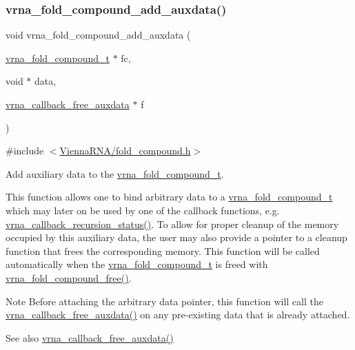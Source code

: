 \subsubsection{\texorpdfstring{vrna\+\_\+fold\+\_\+compound\+\_\+add\+\_\+auxdata()}{vrna\_fold\_compound\_add\_auxdata()}}
{\footnotesize\ttfamily void vrna\+\_\+fold\+\_\+compound\+\_\+add\+\_\+auxdata (\begin{DoxyParamCaption}\item[{\hyperlink{group__fold__compound_ga1b0cef17fd40466cef5968eaeeff6166}{vrna\+\_\+fold\+\_\+compound\+\_\+t} $\ast$}]{fc,  }\item[{void $\ast$}]{data,  }\item[{\hyperlink{group__fold__compound_ga7806651f51b195013839a218b3bbd5a3}{vrna\+\_\+callback\+\_\+free\+\_\+auxdata} $\ast$}]{f }\end{DoxyParamCaption})}



{\ttfamily \#include $<$\hyperlink{fold__compound_8h}{Vienna\+R\+N\+A/fold\+\_\+compound.\+h}$>$}



Add auxiliary data to the \hyperlink{group__fold__compound_ga1b0cef17fd40466cef5968eaeeff6166}{vrna\+\_\+fold\+\_\+compound\+\_\+t}. 

This function allows one to bind arbitrary data to a \hyperlink{group__fold__compound_ga1b0cef17fd40466cef5968eaeeff6166}{vrna\+\_\+fold\+\_\+compound\+\_\+t} which may later on be used by one of the callback functions, e.\+g. \hyperlink{group__fold__compound_gac86036fa8cad1108832335063243cdc8}{vrna\+\_\+callback\+\_\+recursion\+\_\+status()}. To allow for proper cleanup of the memory occupied by this auxiliary data, the user may also provide a pointer to a cleanup function that free\textquotesingle{}s the corresponding memory. This function will be called automatically when the \hyperlink{group__fold__compound_ga1b0cef17fd40466cef5968eaeeff6166}{vrna\+\_\+fold\+\_\+compound\+\_\+t} is free\textquotesingle{}d with \hyperlink{group__fold__compound_ga576a077b418a9c3650e06f8e5d296fc2}{vrna\+\_\+fold\+\_\+compound\+\_\+free()}.

\begin{DoxyNote}{Note}
Before attaching the arbitrary data pointer, this function will call the \hyperlink{group__fold__compound_ga7806651f51b195013839a218b3bbd5a3}{vrna\+\_\+callback\+\_\+free\+\_\+auxdata()} on any pre-\/existing data that is already attached.
\end{DoxyNote}
\begin{DoxySeeAlso}{See also}
\hyperlink{group__fold__compound_ga7806651f51b195013839a218b3bbd5a3}{vrna\+\_\+callback\+\_\+free\+\_\+auxdata()} 
\end{DoxySeeAlso}

